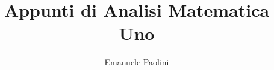 \documentclass{book}
\title{Appunti di Analisi Matematica Uno}
\author{Emanuele Paolini}
\date{}
\begin{document}
\maketitle
\tableofcontents












\appendix


\nocite{forallx}
\nocite{Giusti}
\nocite{Courant}
\nocite{Marcellini}
\nocite{Rudin}
\nocite{PaganiSalsa}



\printindex
\end{document}
